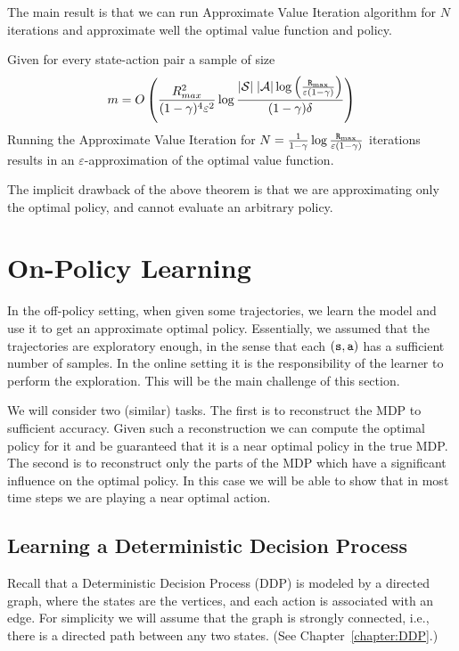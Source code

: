 The main result is that we can run Approximate Value Iteration
algorithm for $N$ iterations and approximate well the optimal value
function and policy.

\begin{theorem}
\label{theorem:avi-near-opt}
Given for every state-action pair a sample of size
\[
m=O\left(\frac{R^2_{max}}{(1-\gamma)^4\varepsilon^2}\log \frac{ |\mathcal{S}| \;|\mathcal{A}|\log \left(
\frac{{\tt R}_{\max }}{\varepsilon(1-\gamma)} \right) }{(1-\gamma)\delta}\right)
\]
Running the Approximate Value Iteration for
$N=\frac{1}{1-\gamma}\log \frac{{\tt R}_{\max }}{\varepsilon(1-\gamma)}$
iterations results in an $\varepsilon$-approximation of the optimal value
function.
\end{theorem}

The implicit drawback of the above theorem is that we are
approximating only the optimal policy, and cannot evaluate an
arbitrary policy.

\section{On-Policy Learning}


In the off-policy setting, when given some trajectories, we learn the model and use it to get an approximate optimal
policy. Essentially, we assumed that the trajectories are
exploratory enough, in the sense that each $({\tt s},{\tt a})$ has a
sufficient number of samples.
%
In the online setting it is the responsibility of the learner to
perform the exploration. This will be the main challenge of this section.

We will consider two (similar) tasks. The first is to reconstruct
the MDP to sufficient accuracy. Given such a reconstruction we can
compute the optimal policy for it and be guaranteed that it is a
near optimal policy in the true MDP. The second is to reconstruct
only the parts of the MDP which have a significant influence on the
optimal policy. In this case we will be able to show that in most
time steps we are playing a near optimal action.

\subsection{Learning a Deterministic Decision Process}

Recall that a Deterministic Decision Process (DDP) is modeled by a
directed graph, where the states are the vertices, and each action
is associated with an edge. For simplicity we will assume that the
graph is strongly connected, i.e., there is a directed path between
any two states. (See Chapter~\ref{chapter:DDP}.)

